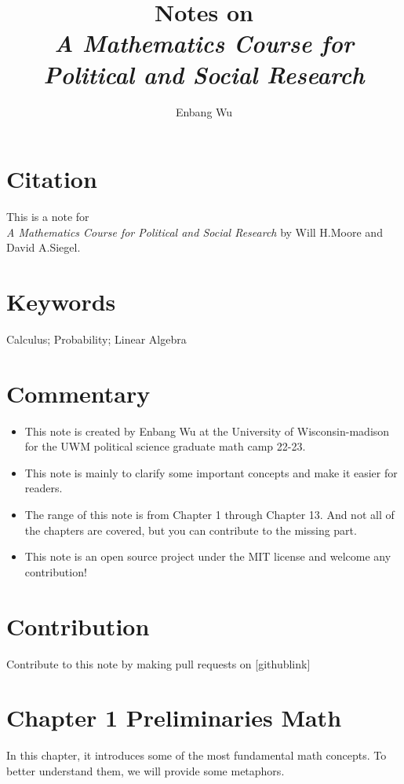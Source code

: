 \documentclass{article}
\title{Notes on \\ \textit{A Mathematics Course for Political and Social Research}}
\author{Enbang Wu}
\begin{document}
\maketitle

\section{Citation}
This is a note for \\ \textit{A Mathematics Course for Political and Social Research} by Will H.Moore and David A.Siegel.

\section{Keywords}
Calculus; Probability; Linear Algebra


\section{Commentary}
\begin{itemize}
    \item This note is created by Enbang Wu at the University of Wisconsin-madison for the UWM political science graduate math camp 22-23.
    \item This note is mainly to clarify some important concepts and make it easier for readers.
    \item The range of this note is from Chapter 1 through Chapter 13. And not all of the chapters are covered, but you can contribute to the missing part.
    \item This note is an open source project under the MIT license and welcome any contribution!
\end{itemize}

\section{Contribution}
Contribute to this note by making pull requests on [githublink]

\newpage
\tableofcontents
\newpage

\section{Chapter 1 Preliminaries Math}
In this chapter, it introduces some of the most fundamental math concepts. To better understand them, we will provide some metaphors.
\end{document}
